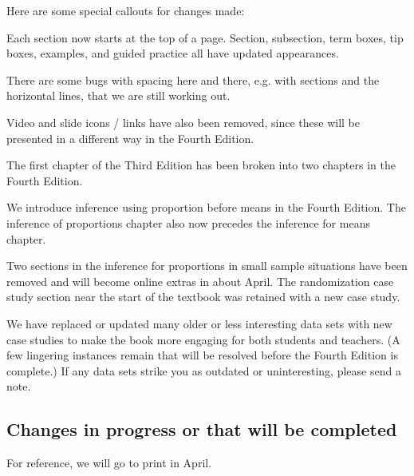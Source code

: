 \noindent%
Here are some special callouts for changes made:
\begin{description}
\item[Stylistic.]
    Each section now starts at the top of a page.
    Section, subsection, term boxes, tip boxes,
    examples, and guided practice
    all have updated appearances.
    
    There are some bugs with spacing here and there,
    e.g. with sections and the horizontal lines,
    that we are still working out.
    
    Video and slide icons / links have also been removed,
    since these will be presented in a different way
    in the Fourth Edition.
\item[Graphics and statistical summaries get their own chapter.]
    The first chapter of the Third Edition has been
    broken into two chapters in the Fourth Edition.
\item[Inference: proportions before means.]
    We introduce inference using proportion before means
    in the Fourth Edition.
    The inference of proportions chapter also now
    precedes the inference for means chapter.
\item[Simulation and randomization.]
    Two sections in the inference for proportions
    in small sample situations have been removed
    and will become online extras in about April.
    The randomization case study section near the start of the
    textbook was retained with a new case study.
\item[Lots of new examples.]
    We have replaced or updated many older or less interesting
    data sets with new case studies to make the book more
    engaging for both students and teachers.
    (A few lingering instances remain that will be resolved
    before the Fourth Edition is complete.)
    If any data sets strike you as outdated or uninteresting,
    please send a note.
\item
    
\end{description}


\subsection*{Changes in progress or that will be completed}

\noindent%
For reference, we will go to print in April.

